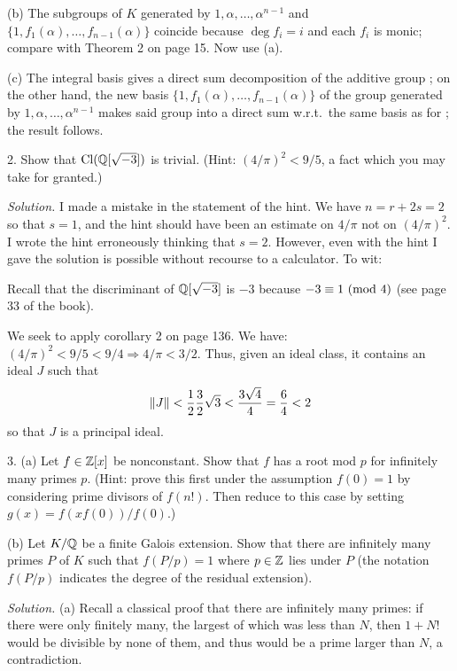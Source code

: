 \documentclass[10pt,a4paper,reqno]{amsart}
\begin{document}
(b) The subgroups of $K$ generated by ${1,\alpha,\dots,\alpha^{n-1}}$ and $\{
1,f_1(\alpha), \dots, f_{n-1}(\alpha) \}$ coincide because $\deg f_i = i$ and
each $f_i$ is monic; compare with Theorem 2 on page 15. Now use (a).

(c) The integral basis gives a direct sum decomposition of the additive group
\OK{}; on the other hand, the new basis $\{ 1,f_1(\alpha), \dots,
f_{n-1}(\alpha) \}$ of the group generated by ${1,\alpha,\dots,\alpha^{n-1}}$
makes said group into a direct sum w.r.t.~the same basis as for \OK; the
result follows.

\bigskip

2. Show that \(\mathrm{Cl}( \mathbb{Q}[\sqrt{-3}] )\) is trivial. (Hint: $(4/\pi)^2 <
9/5$, a fact which you may take for granted.)

\bigskip

\emph{Solution.} I made a mistake in the statement of the hint. We have $n = r
+ 2s = 2$ so that $s=1$, and the hint should have been an estimate on $4/\pi$
not on $(4/\pi)^2$. I wrote the hint erroneously thinking that $s=2$. However,
even with the hint I gave the solution is possible without recourse to a
calculator. To wit:

Recall that the discriminant of $\mathbb{Q}[\sqrt{-3}]$ is $-3$ because $-3 \equiv 1
\text{ } (\mathrm{mod}\text{ } 4)$ (see page 33 of the book).

We seek to apply corollary 2 on page 136. We have: $(4/\pi)^2 < 9/5 < 9/4
\Rightarrow 4/\pi < 3/2$. Thus, given an ideal class, it contains an ideal $J$
such that \[\| J\| < \frac{1}{2}\frac{3}{2} \sqrt{3} < \frac{3\sqrt{4}}{4} =
\frac{6}{4} < 2\] so that $J$ is a principal ideal.

\bigskip

3. (a) Let $f \in \mathbb{Z}[x]$ be nonconstant. Show that $f$ has a root mod $p$ for
infinitely many primes $p$. (Hint: prove this first under the assumption
$f(0)=1$ by considering prime divisors of $f(n!)$. Then reduce to this case by
setting $g(x) = f(xf(0))/f(0)$.)

(b) Let $K/\mathbb{Q}$ be a finite Galois extension. Show that there are infinitely
many primes $P$ of $K$ such that $f(P/p)=1$ where $p\in\mathbb{Z}$ lies under $P$ (the
notation $f(P/p)$ indicates the degree of the residual extension).

\bigskip

\emph{Solution.} (a) Recall a classical proof that there are infinitely many
primes: if there were only finitely many, the largest of which was less than
$N$, then $1+N!$ would be divisible by none of them, and thus would be a prime
larger than $N$, a contradiction.
\end{document}
